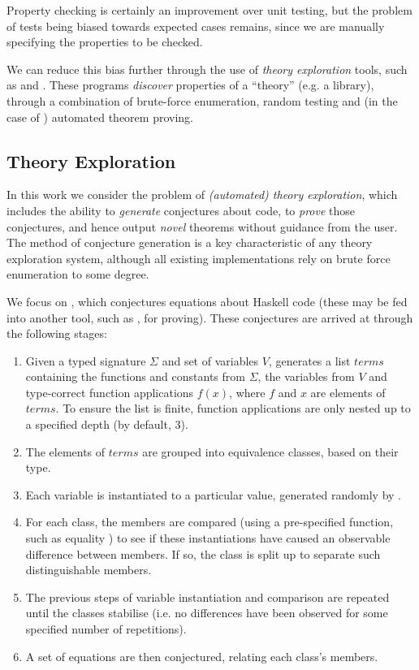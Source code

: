 Property checking is certainly an improvement over unit testing, but the problem of tests being biased towards expected cases remains, since we are manually specifying the properties to be checked.

We can reduce this bias further through the use of \emph{theory exploration} tools, such as \qspec{} and \hspec{}. These programs \emph{discover} properties of a ``theory'' (e.g. a library), through a combination of brute-force enumeration, random testing and (in the case of \hspec{}) automated theorem proving.

\subsection{Theory Exploration}
\label{sec:theoryexploration}

\newcommand{\blank}{\cdot}

In this work we consider the problem of \emph{(automated) theory exploration}, which includes the ability to \emph{generate} conjectures about code, to \emph{prove} those conjectures, and hence output \emph{novel} theorems without guidance from the user. The method of conjecture generation is a key characteristic of any theory exploration system, although all existing implementations rely on brute force enumeration to some degree.

We focus on \qspec{} \citep{QuickSpec}, which conjectures equations about Haskell code (these may be fed into another tool, such as \hspec{}, for proving). These conjectures are arrived at through the following stages:

\begin{enumerate}
  \item Given a typed signature $\Sigma$ and set of variables $V$, \qspec{} generates a list $terms$ containing the functions and constants from $\Sigma$, the variables from $V$ and type-correct function applications $f(x)$, where $f$ and $x$ are elements of $terms$. To ensure the list is finite, function applications are only nested up to a specified depth (by default, 3).
  \item The elements of $terms$ are grouped into equivalence classes, based on their type.
  \item Each variable is instantiated to a particular value, generated randomly by \qcheck{}.
  \item For each class, the members are compared (using a pre-specified function, such as equality \hs{==}) to see if these instantiations have caused an observable difference between members. If so, the class is split up to separate such distinguishable members.
  \item The previous steps of variable instantiation and comparison are repeated until the classes stabilise (i.e. no differences have been observed for some specified number of repetitions).
  \item A set of equations are then conjectured, relating each class's members.
\end{enumerate}


